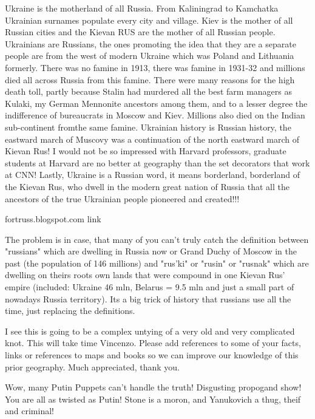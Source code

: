 \begin{itemize}
\begin{itemize}
Ukraine is the motherland of all Russia. From Kaliningrad to Kamchatka
Ukrainian surnames populate every city and village. Kiev is the mother of all
Russian cities and the Kievan RUS are the mother of all Russian people.
Ukrainians are Russians, the ones promoting the idea that they are a separate
people are from the west of modern Ukraine which was Poland and Lithuania
formerly. There was no famine in 1913, there was famine in 1931-32 and millions
died all across Russia from this famine. There were many reasons for the high
death toll, partly because Stalin had murdered all the best farm managers as
Kulaki, my German Mennonite ancestors among them, and to a lesser degree the
indifference of bureaucrats in Moscow and Kiev. Millions also died on the
Indian sub-continent fromthe same famine. Ukrainian history is Russian history,
the eastward march of Muscovy was a continuation of the north eastward march of
Kievan Rus! I would not be so impressed with Harvard professors, graduate
students at Harvard are no better at geography than the set decorators that
work at CNN! Lastly, Ukraine is a Russian word, it means borderland, borderland
of the Kievan Rus, who dwell in the modern great nation of Russia that all the
ancestors of the true Ukrainian people pioneered and created!!!


fortruss.blogspot.com link


The problem is in case, that many of you can't truly catch the definition
between "russians" which are dwelling in Russia now or Grand Duchy of Moscow in
the past (the population of 146 millions) and "rus'ki" or "rusin" or "rusnak"
which are dwelling on theirs roots own lands that were compound in one Kievan
Rus' empire (included: Ukraine 46 mln, Belarus = 9.5 mln and just a small part
of nowadays Russia territory). Its a big trick of history that russians use all
the time, just replacing the definitions.


I see this is going to be a complex untying of a very old and very complicated
knot. This will take time Vincenzo. Please add references to some of your
facts, links or references to maps and books so we can improve our knowledge of
this prior geography. Much appreciated, thank you.


Wow, many Putin Puppets can't handle the truth! Disgusting propogand show! You
are all as twisted as Putin! Stone is a moron, and Yanukovich a thug, theif and
criminal!



\end{itemize}
\end{itemize}
